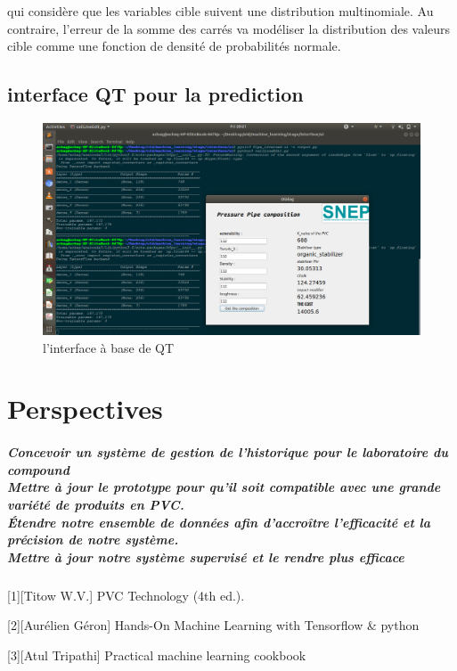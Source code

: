 \documentclass[11pt]{report}
\begin{document}
qui considère que les variables cible suivent une distribution multinomiale. Au contraire, l'erreur de la somme des carrés va modéliser la distribution des valeurs cible comme une fonction de densité de probabilités normale.

\section{interface QT pour la prediction}
\begin{figure}[H]
	\begin{center}
		\includegraphics[width=12cm]{images/implement.png}
		\caption{l'interface à base de QT}
		\label{fig:figure}
	\end{center}
\end{figure}


\chapter*{Perspectives}

\paragraph{Concevoir un système de gestion de l'historique pour le laboratoire du compound\\
Mettre à jour le prototype pour qu'il soit compatible avec une grande variété de produits en PVC.\\
Étendre notre ensemble de données afin d’accroître l’efficacité et la précision de notre système.\\
Mettre à jour notre système supervisé et le rendre plus efficace}





%
%
\newpage

	

\thispagestyle{empty}


[1][Titow W.V.] PVC Technology (4th ed.).

[2][Aurélien Géron] Hands-On Machine Learning with Tensorflow \& python

[3][Atul Tripathi] Practical machine learning cookbook
\newpage

\appendix
\end{document}
